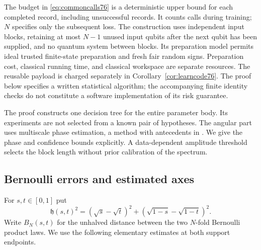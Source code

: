 The budget in \eqref{eq:commoncalls76} is a deterministic upper
bound for each completed record, including unsuccessful records.
It counts calls during training; $N$ specifies only the subsequent
loss.  The construction uses independent input blocks, retaining at
most $N-1$ unused input qubits after the next qubit has been supplied,
and no quantum system between blocks.  Its preparation model permits
ideal trusted finite-state preparation and fresh fair random signs.
Preparation cost, classical running time, and classical workspace are
separate resources.  The reusable payload is charged separately in
Corollary~\ref{cor:learncode76}.  The proof below specifies a written
statistical algorithm; the accompanying finite identity checks do not
constitute a software implementation of its risk guarantee.

The proof constructs one decision tree for the entire parameter body.
Its experiments are not selected from a known pair of hypotheses.
The angular part uses multiscale phase estimation, a method with
antecedents in \cite{HB76,KLY76}.  We give the phase and confidence
bounds explicitly.  A data-dependent amplitude threshold selects the
block length without prior calibration of the spectrum.

\subsection{Bernoulli errors and estimated axes}

For $s,t\in[0,1]$ put
\begin{equation}\label{eq:learnhell76}
 \mathfrak h(s,t)^2=(\sqrt s-\sqrt t)^2
                     +(\sqrt{1-s}-\sqrt{1-t})^2.
\end{equation}
Write $B_N(s,t)$ for the unhalved distance between the two
$N$-fold Bernoulli product laws.
We use the following elementary estimates at both support endpoints.

